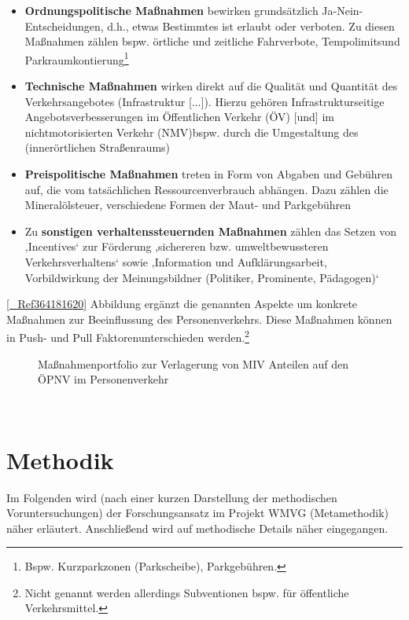 \begin{itemize}
%
   \item \textbf{Ordnungspolitische Maßnahmen} \glqq bewirken grundsätzlich Ja-Nein-Entscheidungen, d.h., etwas Bestimmtes ist erlaubt oder verboten\grqq . Zu diesen Maßnahmen zählen bspw. \glqq örtliche und zeitliche Fahrverbote\grqq , \glqq Tempolimits\grqq  und \glqq Parkraumkontierung\grqq \footnote{%
 Bspw. Kurzparkzonen (Parkscheibe), Parkgebühren.
}%
  \autocites[][]{bib.248}
   \item \textbf{Technische Maßnahmen} wirken \glqq direkt auf die Qualität und Quantität des Verkehrsangebotes (Infrastruktur [$\ldots$])\grqq . Hierzu gehören \glqq Infrastrukturseitige Angebotsverbesserungen im Öffentlichen Verkehr (ÖV) [und] im nichtmotorisierten Verkehr (NMV)\grqq  bspw. durch die \glqq Umgestaltung des (innerörtlichen Straßenraums)\grqq   \autocites[][]{bib.248} 
   \item \textbf{Preispolitische Maßnahmen} treten in Form von Abgaben und Gebühren auf, die vom tatsächlichen Ressourcenverbrauch abhängen. Dazu zählen die Mineralölsteuer, verschiedene Formen der Maut- und Parkgebühren  \autocites[][]{bib.248} 
   \item Zu\textbf{ sonstigen verhaltenssteuernden Maßnahmen} zählen das \glqq Setzen von ‚Incentives‘ zur Förderung ‚sichereren bzw. umweltbewussteren Verkehrsverhaltens‘ sowie ‚Information und Aufklärungsarbeit, Vorbildwirkung der Meinungsbildner (Politiker, Prominente, Pädagogen)‘\grqq   \autocites[][]{bib.248}
%
\end{itemize}
\autoref{_Ref364181620} Abbildung   \autocites[][]{bib.248} ergänzt die genannten Aspekte um konkrete Maßnahmen zur Beeinflussung des Personenverkehrs. Diese Maßnahmen können in \glqq Push- und Pull Faktoren\grqq  unterschieden werden.\footnote{%
 Nicht genannt werden allerdings Subventionen bspw. für öffentliche Verkehrsmittel.
}%
 ~\\

\begin{figure}[htbp]
  \centering
  \caption{ Maßnahmenportfolio zur Verlagerung von MIV Anteilen auf den ÖPNV im Personenverkehr}
  \label{_Ref364181620 _Ref364181497 _Toc363572024 _Toc363601737 _Toc365801597 _Toc366766096}
\end{figure}
~\\


% 
\section{Methodik }
\label{_Toc366775290}
Im Folgenden wird (nach einer kurzen Darstellung der methodischen Voruntersuchungen) der Forschungsansatz im Projekt WMVG (Metamethodik) näher erläutert. Anschließend wird auf methodische Details näher eingegangen.~\\


